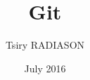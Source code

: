 \documentclass[a4paper,12pt]{book}
\begin{document}
\author{Tsiry RADIASON}
\title{Git}
\date{July 2016}

\frontmatter
\maketitle
\tableofcontents

\mainmatter



\backmatter

\end{document}

